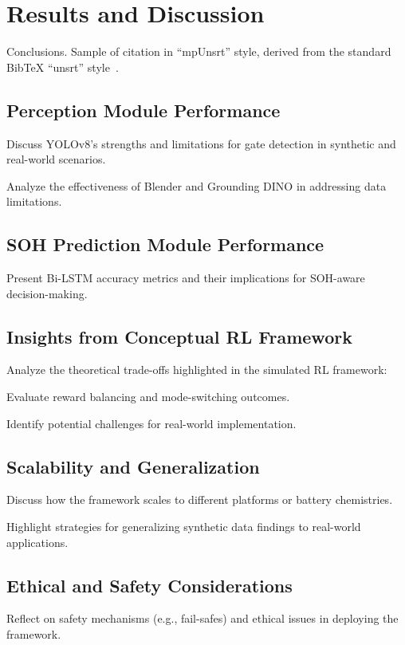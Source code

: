 \chapter{Results and Discussion}\label{ch:6}
\minitoc

Conclusions. Sample of citation \cite{DBLP:journals/sigcas/X91} in ``mpUnsrt'' style, derived from the standard {Bib\TeX} ``unsrt'' style~\cite{Lamport1994-Latex}.

\newpage

\section{Perception Module Performance}

Discuss YOLOv8's strengths and limitations for gate detection in synthetic and real-world scenarios.


Analyze the effectiveness of Blender and Grounding DINO in addressing data limitations.


\section{SOH Prediction Module Performance}

Present Bi-LSTM accuracy metrics and their implications for SOH-aware decision-making.


\section{Insights from Conceptual RL Framework}

Analyze the theoretical trade-offs highlighted in the simulated RL framework:

Evaluate reward balancing and mode-switching outcomes.

Identify potential challenges for real-world implementation.


\section{Scalability and Generalization}

Discuss how the framework scales to different platforms or battery chemistries.

Highlight strategies for generalizing synthetic data findings to real-world applications.


\section{Ethical and Safety Considerations}

Reflect on safety mechanisms (e.g., fail-safes) and ethical issues in deploying the framework.

\endinput